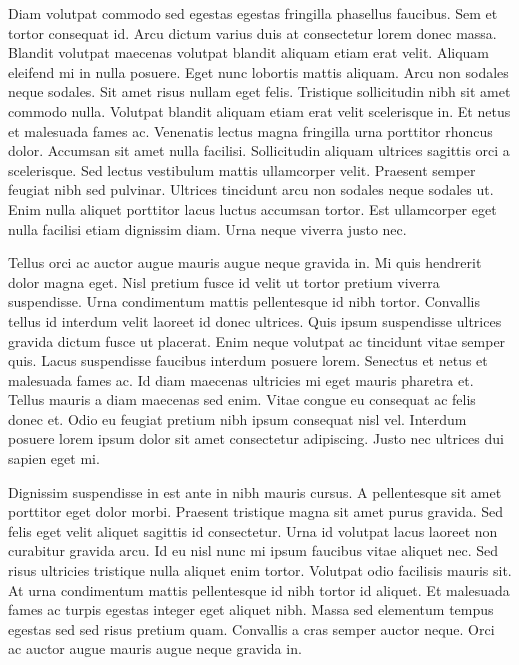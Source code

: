 \documentclass[11pt,a4paper]{article}
\begin{document}
Diam volutpat commodo sed egestas egestas fringilla phasellus faucibus. Sem et tortor consequat id. Arcu dictum varius duis at consectetur lorem donec massa. Blandit volutpat maecenas volutpat blandit aliquam etiam erat velit. Aliquam eleifend mi in nulla posuere. Eget nunc lobortis mattis aliquam. Arcu non sodales neque sodales. Sit amet risus nullam eget felis. Tristique sollicitudin nibh sit amet commodo nulla. Volutpat blandit aliquam etiam erat velit scelerisque in. Et netus et malesuada fames ac. Venenatis lectus magna fringilla urna porttitor rhoncus dolor. Accumsan sit amet nulla facilisi. Sollicitudin aliquam ultrices sagittis orci a scelerisque. Sed lectus vestibulum mattis ullamcorper velit. Praesent semper feugiat nibh sed pulvinar. Ultrices tincidunt arcu non sodales neque sodales ut. Enim nulla aliquet porttitor lacus luctus accumsan tortor. Est ullamcorper eget nulla facilisi etiam dignissim diam. Urna neque viverra justo nec.

Tellus orci ac auctor augue mauris augue neque gravida in. Mi quis hendrerit dolor magna eget. Nisl pretium fusce id velit ut tortor pretium viverra suspendisse. Urna condimentum mattis pellentesque id nibh tortor. Convallis tellus id interdum velit laoreet id donec ultrices. Quis ipsum suspendisse ultrices gravida dictum fusce ut placerat. Enim neque volutpat ac tincidunt vitae semper quis. Lacus suspendisse faucibus interdum posuere lorem. Senectus et netus et malesuada fames ac. Id diam maecenas ultricies mi eget mauris pharetra et. Tellus mauris a diam maecenas sed enim. Vitae congue eu consequat ac felis donec et. Odio eu feugiat pretium nibh ipsum consequat nisl vel. Interdum posuere lorem ipsum dolor sit amet consectetur adipiscing. Justo nec ultrices dui sapien eget mi.

Dignissim suspendisse in est ante in nibh mauris cursus. A pellentesque sit amet porttitor eget dolor morbi. Praesent tristique magna sit amet purus gravida. Sed felis eget velit aliquet sagittis id consectetur. Urna id volutpat lacus laoreet non curabitur gravida arcu. Id eu nisl nunc mi ipsum faucibus vitae aliquet nec. Sed risus ultricies tristique nulla aliquet enim tortor. Volutpat odio facilisis mauris sit. At urna condimentum mattis pellentesque id nibh tortor id aliquet. Et malesuada fames ac turpis egestas integer eget aliquet nibh. Massa sed elementum tempus egestas sed sed risus pretium quam. Convallis a cras semper auctor neque. Orci ac auctor augue mauris augue neque gravida in.
\end{document}
